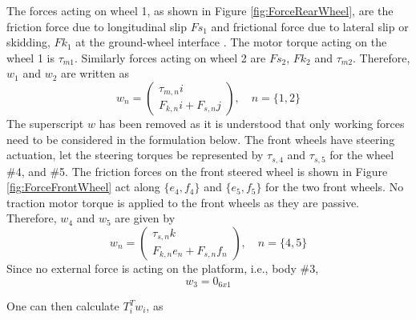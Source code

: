 {The forces acting on wheel 1, as shown in Figure \ref{fig:ForceRearWheel},  are the friction force due to longitudinal slip $Fs_1$ and frictional force  due to lateral slip or skidding, $Fk_1$ at the ground-wheel interface . The motor torque acting on the wheel 1 is $\tau_{m1}$.  Similarly forces acting on wheel 2 are $Fs_2$, $Fk_2$ and $\tau_{m2}$. Therefore, $w_1$ and $w_2$ are written as 
\begin{equation}
\label{eqn:wrenchWheelSlipRear}
 w_n=\begin{pmatrix}
\tau_{m,n}i\\
F_{k,n}i+F_{s,n}j
\end{pmatrix},  \quad n=\{1,2\}
\end{equation}
The superscript $w$ has been removed as it is understood that only working forces need to be considered in the formulation below. 
The front wheels have steering actuation, let the steering  torques be represented by $\tau_{s,4}$ and  $\tau_{s,5}$ for the wheel \#4, and \#5. The friction forces on the front steered wheel is shown in Figure \ref{fig:ForceFrontWheel} act along $\{e_4,f_4\}$ and $\{e_5,f_5\}$ for the two front wheels. No traction motor torque is applied to the front wheels as they are passive. Therefore, $w_4$ and $w_5$ are given by
\begin{equation}
\label{eqn:wrenchWheelSlipFront}
w_n=\begin{pmatrix}
\tau_{s,n}k\\
F_{k,n}e_n+F_{s,n}f_n
\end{pmatrix},  \quad n=\{4,5\}
\end{equation}
Since no external force is acting on the platform, i.e., body \#3, \[w_3=0_{6x1}\]

One can then calculate $T_i^Tw_i$, as

}
